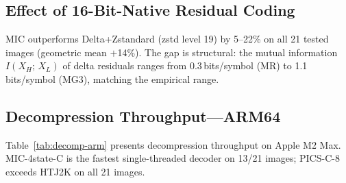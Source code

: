 \documentclass[journal]{IEEEtran}
\begin{document}
\subsection{Effect of 16-Bit-Native Residual Coding}

MIC outperforms Delta+Zstandard (zstd level 19) by 5--22\% on all 21 tested
images (geometric mean $+$14\%). The gap is structural: the mutual information
$I(X_H;\, X_L)$ of delta residuals ranges from 0.3\,bits/symbol (MR) to
1.1\,bits/symbol (MG3), matching the empirical range.

\subsection{Decompression Throughput---ARM64}

Table~\ref{tab:decomp-arm} presents decompression throughput on Apple M2 Max.
MIC-4state-C is the fastest single-threaded decoder on 13/21 images; PICS-C-8
exceeds HTJ2K on all 21 images.
\end{document}
